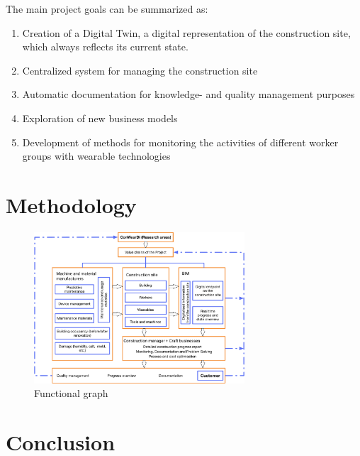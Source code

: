 The main project goals can be summarized as:
\begin{enumerate}
  \item Creation of a Digital Twin, a digital representation of the construction site, which always reflects its current state. 
  \item Centralized system for managing the construction site
  \item Automatic documentation for knowledge- and quality management purposes
  \item Exploration of new business models
  \item Development of methods for monitoring the activities of different worker groups with wearable technologies
\end{enumerate}

\section{Methodology}

\begin{figure}
\includegraphics[width=0.7\textwidth]{figures/conweardi-functional}
\caption{Functional graph}
\end{figure}



\section{Conclusion}


